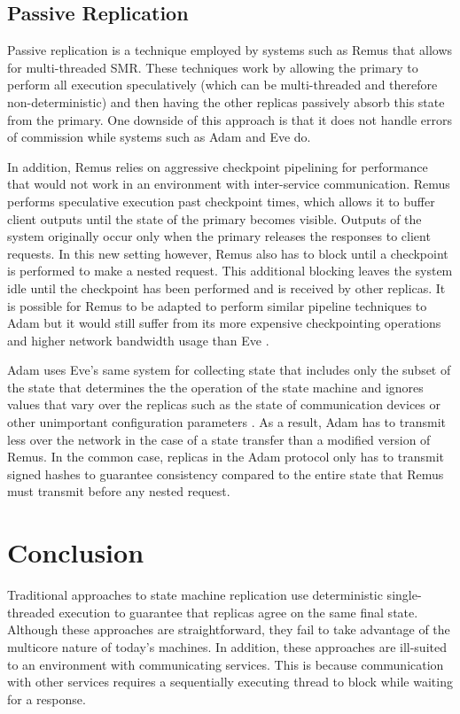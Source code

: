 \documentclass[11pt, oneside]{report}
\begin{document}
\section{Passive Replication}

Passive replication is a technique employed by systems such as Remus \cite{remus} that allows for multi-threaded SMR. 
These techniques work by allowing the primary to perform all execution speculatively (which can be multi-threaded and therefore non-deterministic) and then having the other replicas passively absorb this state from the primary.
One downside of this approach is that it does not handle errors of commission while systems such as Adam and Eve do.

In addition, Remus relies on aggressive checkpoint pipelining for performance that would not work in an environment with inter-service communication.
Remus performs speculative execution past checkpoint times, which allows it to buffer client outputs until the state of the primary becomes visible. 
Outputs of the system originally occur only when the primary releases the responses to client requests.
In this new setting however, Remus also has to block until a checkpoint is performed to make a nested request. 
This additional blocking leaves the system idle until the checkpoint has been performed and is received by other replicas.
It is possible for Remus to be adapted to perform similar pipeline techniques to Adam but it would still suffer from its more expensive checkpointing operations and higher network bandwidth usage than Eve \cite{eve}. 

Adam uses Eve's same system for collecting state that includes only the subset of the state that determines the the operation of the state machine and ignores values that vary over the replicas such as the state of communication devices or other unimportant configuration parameters \cite{manosThesis}.
As a result, Adam has to transmit less over the network in the case of a state transfer than a modified version of Remus.
In the common case, replicas in the Adam protocol only has to transmit signed hashes to guarantee consistency compared to the entire state that Remus must transmit before any nested request.

\chapter{Conclusion}\label{Conclusion}

Traditional approaches to state machine replication use deterministic single-threaded execution to guarantee that replicas agree on the same final state. 
Although these approaches are straightforward, they fail to take advantage of the multicore nature of today's machines. 
In addition, these approaches are ill-suited to an environment with communicating services. 
This is because communication with other services requires a sequentially executing thread to block while waiting for a response. 
\end{document}
